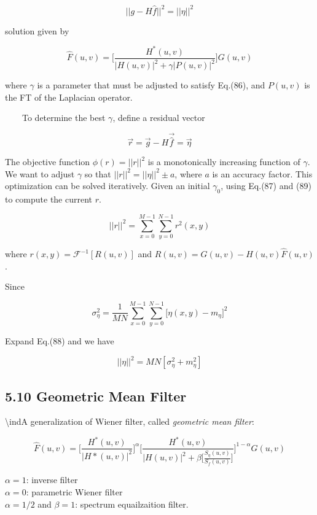 \documentclass[]{article}
\begin{document}
\[||g-H\hat{f}||^2=||\eta||^2\]

solution given by

\[\hat{F}(u,v)=\Bigg[\dfrac{H^*(u,v)}{|H(u,v)|^2+\gamma|P(u,v)|^2}\Bigg]G(u,v)\]

where \(\gamma\) is a parameter that must be adjusted to satisfy
Eq.(86), and \(P(u,v)\) is the FT of the Laplacian operator.

\(\quad\quad\)To determine the best \(\gamma\), define a residual vector

\[\vec{r}=\vec{g}-H\vec{\hat{f}}=\vec{\eta}\]

The objective function \(\phi(r)=||r||^2\) is a monotonically increasing
function of \(\gamma\). We want to adjust \(\gamma\) so that
\(||r||^2=||\eta||^2\pm a\), where \(a\) is an accuracy factor. This
optimization can be solved iteratively. Given an initial \(\gamma_{0}\),
using Eq.(87) and (89) to compute the current \(r\).

\[||r||^2=\sum\limits^{M-1}_{x=0}\sum\limits^{N-1}_{y=0}r^2(x,y)\]

where \(r(x,y)=\mathcal{F}^{-1}[R(u,v)]\) and
\(R(u,v)=G(u,v)-H(u,v)\hat{F}(u,v)\).

Since

\[\sigma^2_\eta=\dfrac{1}{MN}\sum\limits^{M-1}_{x=0}\sum\limits^{N-1}_{y=0}\big[\eta(x,y)-m_\eta \big]^2\]

Expand Eq.(88) and we have

\[||\eta||^2=MN[\sigma_\eta^2+m^2_\eta]\]

\subsection{5.10 Geometric Mean Filter}\label{header-n877}

\textbackslash{}indA generalization of Wiener filter, called
\emph{geometric mean filter}:

\[\hat{F}(u,v)=\Bigg[\dfrac{H^*(u,v)}{|H*(u,v)|^2}\Bigg]^\alpha\Bigg[\dfrac{H^*(u,v)}{|H(u,v)|^2+\beta\big[\frac{S_\eta(u,v)}{S_f(u,v)}]}\Bigg]^{1-\alpha}G(u,v)\]

\(\alpha=1\): inverse filter\\
 \(\alpha =0\): parametric Wiener filter\\
 \(\alpha=1/2\) and \(\beta=1\): spectrum equailzaition filter.
\end{document}
